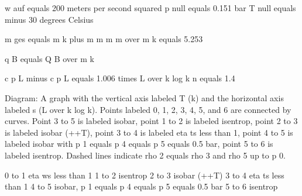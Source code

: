 w auf equals 200 meters per second squared  
p null equals 0.151 bar  
T null equals minus 30 degrees Celsius  

m ges equals m k plus m m  
m m over m k equals 5.253  

q B equals Q B over m k  

c p L minus c p L equals 1.006 times L over k log k  
n equals 1.4  

Diagram:  
A graph with the vertical axis labeled T (k) and the horizontal axis labeled s (L over k log k).  
Points labeled 0, 1, 2, 3, 4, 5, and 6 are connected by curves.  
Point 3 to 5 is labeled isobar, point 1 to 2 is labeled isentrop, point 2 to 3 is labeled isobar (++T), point 3 to 4 is labeled eta ts less than 1, point 4 to 5 is labeled isobar with p 1 equals p 4 equals p 5 equals 0.5 bar, point 5 to 6 is labeled isentrop.  
Dashed lines indicate rho 2 equals rho 3 and rho 5 up to p 0.  

0 to 1 eta ws less than 1  
1 to 2 isentrop  
2 to 3 isobar (++T)  
3 to 4 eta ts less than 1  
4 to 5 isobar, p 1 equals p 4 equals p 5 equals 0.5 bar  
5 to 6 isentrop